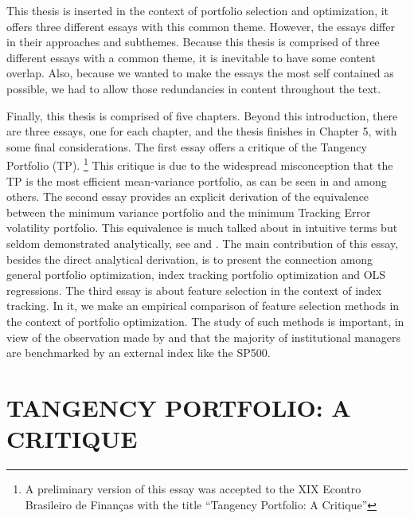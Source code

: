 \documentclass[12pt,oneside,a4paper]{memoir}
\begin{document}
This thesis is inserted in the context of portfolio selection and optimization, it offers three different essays with this common theme.
However, the essays differ in their approaches and subthemes.
Because this thesis is comprised of three different essays with a common theme, it is inevitable to have some content overlap.
Also, because we wanted to make the essays the most self contained as possible, we had to allow those redundancies in content throughout the text.

Finally, this thesis is comprised of five chapters.
Beyond this introduction, there are three essays, one for each chapter, and the thesis finishes in Chapter 5, with some final considerations.
The first essay offers a critique of the Tangency Portfolio (TP).
\footnote{A preliminary version of this essay was accepted to the XIX Econtro Brasileiro de Finanças with the title ``Tangency Portfolio: A Critique''}
This critique is due to the widespread misconception that the TP is the most efficient mean-variance portfolio, as can be seen in  and  among others.
The second essay provides an explicit derivation of the equivalence between the minimum variance portfolio and the minimum Tracking Error volatility portfolio.
This equivalence is much talked about in intuitive terms but seldom demonstrated analytically, see  and .
The main contribution of this essay, besides the direct analytical derivation, is to present the connection among general portfolio optimization, index tracking portfolio optimization and OLS regressions.
The third essay is about feature selection in the context of index tracking.
In it, we make an empirical comparison of feature selection methods in the context of portfolio optimization.
The study of such methods is important, in view of the observation made by  and  that the majority of institutional managers are benchmarked by an external index like the SP500.

\chapter{TANGENCY PORTFOLIO: A CRITIQUE}
\end{document}
